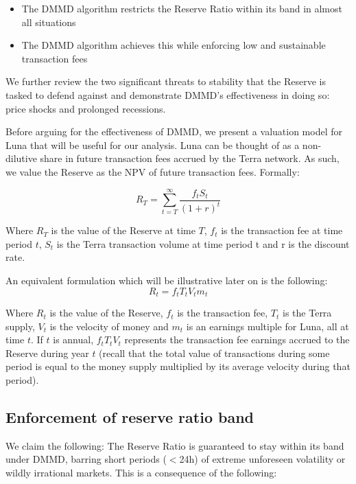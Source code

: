 \documentclass{article}
\begin{document}
\begin{itemize}
    \item The DMMD algorithm restricts the Reserve Ratio within its band in almost all situations
    
    \item The DMMD algorithm achieves this while enforcing low and sustainable transaction fees
\end{itemize}

We further review the two significant threats to stability that the Reserve is tasked to defend against and demonstrate DMMD's effectiveness in doing so: price shocks and prolonged recessions.

Before arguing for the effectiveness of DMMD, we present a valuation model for Luna that will be useful for our analysis. Luna can be thought of as a non-dilutive share in future transaction fees accrued by the Terra network. As such, we value the Reserve as the NPV of future transaction fees. Formally:

$$R_T = \sum_{t=T}^{\infty}\frac{f_tS_t}{(1+r)^t}$$ \newline

Where $R_T$ is the value of the Reserve at time $T$, $f_t$ is the transaction fee at time period $t$, $S_t$ is the Terra transaction volume at time period t and r is the discount rate.

An equivalent formulation which will be illustrative later on is the following:
 $$R_t = f_tT_tV_tm_t$$
 
 Where $R_t$ is the value of the Reserve, $f_t$ is the transaction fee, $T_t$ is the Terra supply, $V_t$ is the velocity of money and $m_t$ is an earnings multiple for Luna, all at time $t$. If $t$ is annual, $f_tT_tV_t$ represents the transaction fee earnings accrued to the Reserve during year $t$ (recall that the total value of transactions during some period is equal to the money supply multiplied by its average velocity during that period).

\subsection{Enforcement of reserve ratio band}

We claim the following: 
The Reserve Ratio is guaranteed to stay within its band under DMMD, barring short periods ($<$24h) of extreme unforeseen volatility or wildly irrational markets. This is a consequence of the following:
\end{document}
